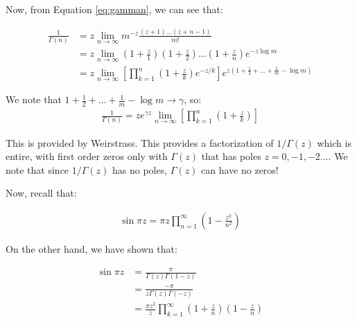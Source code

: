 \documentclass{article}
\theoremstyle{definition}
\begin{document}
Now, from Equation \ref{eq:gamman}, we can see that:

\begin{align*}
\frac{1}{\Gamma(n)}  &= z \lim_{n\to\infty} m^{-z}\frac{(z+1)...(z+n-1)}{m!} \\ 
& = z \lim_{n\to\infty} (1+\frac{z}{1}) (1+\frac{z}{2}) ... (1+\frac{z}{n}) e^{-z\log m} \\ 
&  = z \lim_{n\to\infty} \left[\prod_{k=1}^n (1+\frac{z}{k}) e^{-z/k}\right] e^{z(1 + \frac{1}{2} + ... + \frac{1}{m} - \log m )}
\end{align*}

We note that $1 + \frac{1}{2} + ... + \frac{1}{m} - \log m  \to \gamma$, so:
\begin{align*}
\frac{1}{\Gamma(n)}  = z e^{\gamma z} \lim_{n\to\infty} \left[\prod_{k=1}^n (1+\frac{z}{k}) \right]
\end{align*}

This is provided by Weirstrass. This provides a factorization of $1/\Gamma(z)$ which is entire, with first order zeros only with $\Gamma(z)$ that has poles $z = 0, -1, -2...$. We note that since $1/\Gamma(z)$ has no poles, $\Gamma(z)$ can have no zeros!

Now, recall that:

\begin{align*}
\sin \pi z = \pi z \prod_{n=1}^\infty (1-\frac{z^2}{n^2})
\end{align*}

On the other hand, we have shown that:

\begin{align*}
\sin \pi z &= \frac{\pi}{\Gamma(z) \Gamma(1-z)} \\ 
&= \frac{-\pi}{z \Gamma(z) \Gamma(-z)} \\ 
&= \frac{\pi z^2}{z} \prod_{k=1}^\infty (1+\frac{z}{n})(1-\frac{z}{n})
\end{align*}
\end{document}
